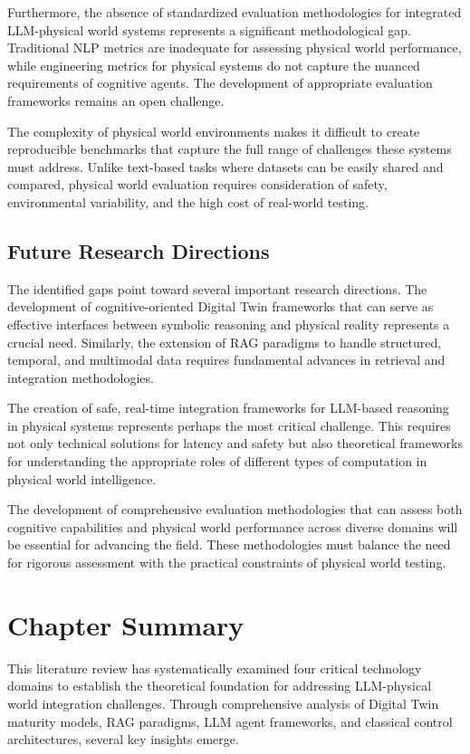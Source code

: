 Furthermore, the absence of standardized evaluation methodologies for integrated LLM-physical world systems represents a significant methodological gap. Traditional NLP metrics are inadequate for assessing physical world performance, while engineering metrics for physical systems do not capture the nuanced requirements of cognitive agents. The development of appropriate evaluation frameworks remains an open challenge.

The complexity of physical world environments makes it difficult to create reproducible benchmarks that capture the full range of challenges these systems must address. Unlike text-based tasks where datasets can be easily shared and compared, physical world evaluation requires consideration of safety, environmental variability, and the high cost of real-world testing.

\subsection{Future Research Directions}

The identified gaps point toward several important research directions. The development of cognitive-oriented Digital Twin frameworks that can serve as effective interfaces between symbolic reasoning and physical reality represents a crucial need. Similarly, the extension of RAG paradigms to handle structured, temporal, and multimodal data requires fundamental advances in retrieval and integration methodologies.

The creation of safe, real-time integration frameworks for LLM-based reasoning in physical systems represents perhaps the most critical challenge. This requires not only technical solutions for latency and safety but also theoretical frameworks for understanding the appropriate roles of different types of computation in physical world intelligence.

The development of comprehensive evaluation methodologies that can assess both cognitive capabilities and physical world performance across diverse domains will be essential for advancing the field. These methodologies must balance the need for rigorous assessment with the practical constraints of physical world testing.

\section{Chapter Summary}

This literature review has systematically examined four critical technology domains to establish the theoretical foundation for addressing LLM-physical world integration challenges. Through comprehensive analysis of Digital Twin maturity models, RAG paradigms, LLM agent frameworks, and classical control architectures, several key insights emerge.

